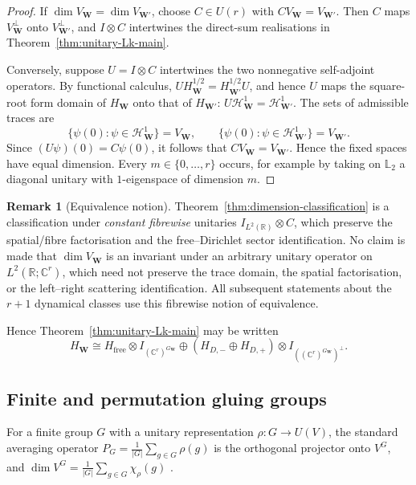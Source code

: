 \documentclass[11pt]{article}
\theoremstyle{plain}
\theoremstyle{definition}
\newtheorem{remark}[theorem]{Remark}
\newcommand{\R}{\mathbb{R}}
\newcommand{\C}{\mathbb{C}}
\newcommand{\Ltwo}{\mathbb{L}_{2}}
\begin{document}
\begin{proof}
If \(\dim V_{\mathbf W}=\dim V_{\mathbf W'}\), choose \(C\in U(r)\) with
\(CV_{\mathbf W}=V_{\mathbf W'}\).
Then \(C\) maps \(V_{\mathbf W}^{\perp}\) onto \(V_{\mathbf W'}^{\perp}\), and
\(I\otimes C\) intertwines the direct-sum realisations in Theorem~\ref{thm:unitary-Lk-main}.

Conversely, suppose \(U=I\otimes C\) intertwines the two nonnegative self-adjoint operators. By functional calculus,
\(U H_{\mathbf W}^{1/2} = H_{\mathbf W'}^{1/2}U\),
and hence \(U\) maps the square-root form domain of \(H_{\mathbf W}\) onto that of \(H_{\mathbf W'}\):
\(U\mathcal H_{\mathbf W}^1 = \mathcal H_{\mathbf W'}^1\).
The sets of admissible traces are
\[
\{\psi(0):\psi\in\mathcal H_{\mathbf W}^1\}=V_{\mathbf W},
\qquad
\{\psi(0):\psi\in\mathcal H_{\mathbf W'}^1\}=V_{\mathbf W'}.
\]
Since
\((U\psi)(0)=C\psi(0)\),
it follows that
\(CV_{\mathbf W}=V_{\mathbf W'}\).
Hence the fixed spaces have equal dimension. Every \(m\in\{0,\ldots,r\}\) occurs, for example by taking on \(\Ltwo\) a diagonal unitary with \(1\)-eigenspace of dimension \(m\).
\end{proof}

\begin{remark}[Equivalence notion]
\label{rem:fibrewise-equivalence}
Theorem~\ref{thm:dimension-classification} is a classification under
\emph{constant fibrewise} unitaries \(I_{L^2(\R)}\otimes C\), which preserve
the spatial/fibre factorisation and the free--Dirichlet sector
identification. No claim is made that
\(\dim V_{\mathbf W}\) is an invariant under an arbitrary unitary operator
on \(L^2(\R;\C^r)\), which need not preserve the trace domain, the spatial
factorisation, or the left--right scattering identification. All
subsequent statements about the \(r+1\) dynamical classes use this
fibrewise notion of equivalence.
\end{remark}

Hence Theorem~\ref{thm:unitary-Lk-main} may be written
\[
H_{\mathbf W}
\cong
H_{\mathrm{free}}\otimes I_{(\C^r)^{G_{\mathbf W}}}
\oplus
(H_{D,-}\oplus H_{D,+})
\otimes I_{((\C^r)^{G_{\mathbf W}})^\perp}.
\]

\subsection{Finite and permutation gluing groups}

For a finite group \(G\) with a unitary representation
\(\rho:G\to U(V)\), the standard averaging operator \(P_G=\frac1{|G|}\sum_{g\in G}\rho(g)\) is the orthogonal projector onto \(V^G\), and
\(\dim V^G=\frac1{|G|}\sum_{g\in G}\chi_\rho(g)\)
\citep{BrockerTomDieck1985,Hall2015}.
\end{document}
